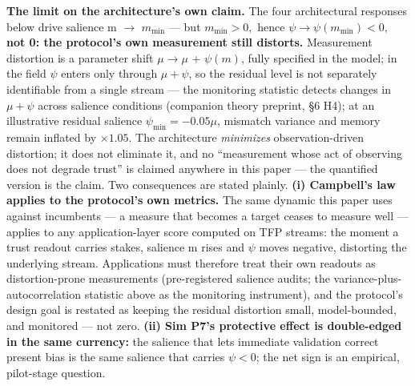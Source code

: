 \documentclass[11pt,twocolumn]{article}
\begin{document}
\textbf{The limit on the architecture's own claim.} The four
architectural responses below drive salience m \(\to\)
\(m_{\mathrm{min}}\) --- but \(m_{\mathrm{min}} > 0,\) hence
\textbf{\(\psi \to \psi (m_{\mathrm{min}}) < 0,\) not 0: the protocol's
own measurement still distorts.} Measurement distortion is a parameter
shift \(\mu \to \mu\) + \(\psi (m)\), fully specified in the model; in
the field \(\psi\) enters only through \(\mu+\psi\), so the residual
level is not separately identifiable from a single stream --- the
monitoring statistic detects changes in \(\mu+\psi\) across salience
conditions (companion theory preprint, §6 H4); at an
illustrative residual salience \(\psi_{\mathrm{min}} = -0.05\mu\),
mismatch variance and memory remain inflated by \(\times 1.05\). The
architecture \emph{minimizes} observation-driven distortion; it does not
eliminate it, and no ``measurement
whose act of observing does not degrade trust'' is claimed anywhere in this
paper --- the quantified version is the claim. Two consequences are stated plainly.
\textbf{(i) Campbell's law applies to the protocol's own metrics.} The
same dynamic this paper uses against incumbents --- a measure that
becomes a target ceases to measure well --- applies to any
application-layer score computed on TFP streams: the moment a trust
readout carries stakes, salience m rises and \(\psi\) moves negative,
distorting the underlying stream. Applications must therefore treat
their own readouts as distortion-prone measurements (pre-registered
salience audits; the variance-plus-autocorrelation statistic above as
the monitoring instrument), and the protocol's design goal is restated
as keeping the residual distortion small, model-bounded, and monitored
--- not zero. \textbf{(ii) Sim P7's protective effect is double-edged in the
same currency:} the salience that lets immediate validation correct
present bias is the same salience that carries \(\psi < 0\); the net
sign is an empirical, pilot-stage question.
\end{document}
